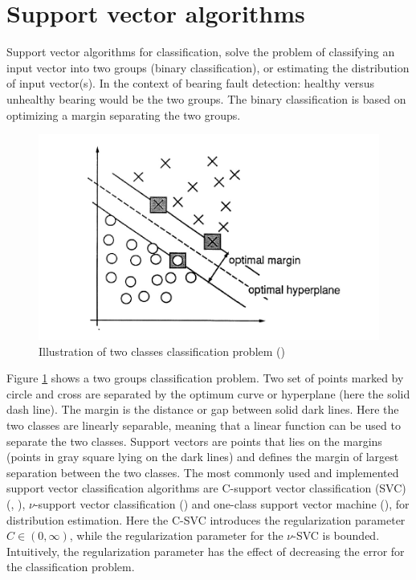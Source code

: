 \documentclass[../Main/thesis.tex]{subfiles}
\begin{document}
\section{Support vector algorithms }
\label{sec:svm}
Support vector algorithms for classification, solve the problem of classifying an input vector into two groups (binary classification), or estimating the distribution of input vector(s). In the context of bearing fault detection: healthy versus unhealthy bearing would be the two groups. The  binary classification is based on optimizing a margin separating the two groups. 
\begin{figure}[H] %
   \centering
   \includegraphics[width=5in]{../fig/svm2d.png} 
   \caption{Illustration of two classes classification problem (\cite{vapnik1995})}
   \label{fig:svm2d}
\end{figure}
\justify
Figure \ref{fig:svm2d} shows a two groups classification problem. Two set of points marked by circle and cross are separated by the optimum curve or hyperplane (here the solid dash line). The margin is the distance or gap between solid dark lines. Here the two classes are linearly separable, meaning that a linear function can be used to separate the two classes. Support vectors are points that lies on the margins (points in gray square lying on the dark lines) and defines the margin of largest separation between the two classes.
\justify
The most commonly used and implemented support vector classification algorithms are  C-support vector classification (SVC) (\cite{bosser1992}, \cite{vapnik1995}), $\nu$-support vector classification (\cite{kp2000}) and one-class support vector machine (\cite{kp2001}), for distribution estimation. Here the C-SVC introduces the regularization parameter $C\in (0,\infty)$, while the regularization parameter for the $\nu$-SVC is bounded. Intuitively, the regularization parameter has the effect of decreasing the error for the classification problem.
\end{document}
